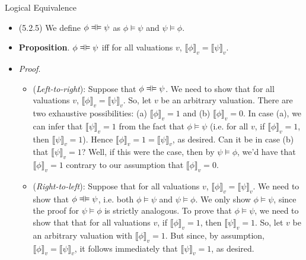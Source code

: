 \documentclass[../slides.tex]{subfiles}
\begin{document}
\begin{frame}{Logical Equivalence}

	\begin{itemize}
	
		\item (5.2.5) We define $\phi\equi\psi$ as $\phi\vDash\psi$ and $\psi\vDash\phi$.
		
		\item \textbf{Proposition}. $\phi\equi\psi$ iff for all valuations $v$, $\llbracket\phi\rrbracket_v=\llbracket\psi\rrbracket_v$.
		
		\item[] \emph{Proof}.
		
		\begin{itemize}
			
				\item (\emph{Left-to-right}): Suppose that $\phi\equi\psi$. We need to show that for all valuations $v$, $\llbracket\phi\rrbracket_v=\llbracket\psi\rrbracket_v$. So, let $v$ be an arbitrary valuation. There are two exhaustive possibilities: (a) $\llbracket\phi\rrbracket_v=1$ and (b) $\llbracket \phi\rrbracket_v=0$. In case (a), we can infer that $\llbracket\psi\rrbracket_v=1$ from the fact that $\phi\vDash\psi$ (i.e. for all $v$, if $\llbracket\phi\rrbracket_v=1$, then $\llbracket\psi\rrbracket_v=1$). Hence $\llbracket \phi\rrbracket_v=1=\llbracket \psi\rrbracket_v$, as desired. Can it be in case (b) that $\llbracket\psi\rrbracket_v=1$? Well, if this were the case, then by $\psi\vDash\phi$, we'd have that $\llbracket\phi\rrbracket_v=1$ contrary to our assumption that $\llbracket\phi\rrbracket_v=0$.
				
				\item (\emph{Right-to-left}): Suppose that for all valuations $v$, $\llbracket\phi\rrbracket_v=\llbracket\psi\rrbracket_v$. We need to show that $\phi\equi\psi$, i.e. both $\phi\vDash\psi$ and $\psi\vDash\phi$. We only show $\phi\vDash\psi$, since the proof for  $\psi\vDash\phi$ is strictly analogous. To prove that $\phi\vDash\psi$, we need to show that that for all valuations $v$, if $\llbracket\phi\rrbracket_v=1$, then $\llbracket\psi\rrbracket_v=1$. So, let $v$ be an arbitrary valuation with $\llbracket\phi\rrbracket_v=1$. But since, by assumption, $\llbracket\phi\rrbracket_v=\llbracket\psi\rrbracket_v$, it follows immediately that $\llbracket\psi\rrbracket_v=1$, as desired.
			\end{itemize}
	
	\end{itemize}

\end{frame}
\end{document}
